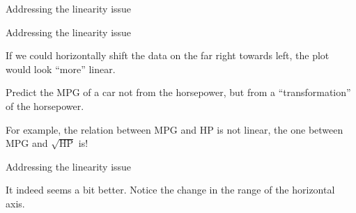 \documentclass{beamer}\usepackage[]{graphicx}\usepackage[]{color}
\makeatletter
\newcommand{\hlstr}[1]{\textcolor[rgb]{1,0.894,0.71}{#1}}%
\newcommand{\hlopt}[1]{\textcolor[rgb]{1,0.894,0.769}{#1}}%
\newcommand{\hlstd}[1]{\textcolor[rgb]{1,0.894,0.769}{#1}}%
\newcommand{\hlkwb}[1]{\textcolor[rgb]{0.804,0.776,0.451}{#1}}%
\newcommand{\hlkwc}[1]{\textcolor[rgb]{0.78,0.941,0.545}{#1}}%
\newcommand{\hlkwd}[1]{\textcolor[rgb]{1,0.78,0.769}{#1}}%
\newenvironment{kframe}{%
 \def\at@end@of@kframe{}%
 \ifinner\ifhmode%
  \def\at@end@of@kframe{\end{minipage}}%
  \begin{minipage}{\columnwidth}%
 \fi\fi%
 \def\FrameCommand##1{\hskip\@totalleftmargin \hskip-\fboxsep
 \colorbox{shadecolor}{##1}\hskip-\fboxsep
     \hskip-\linewidth \hskip-\@totalleftmargin \hskip\columnwidth}%
 \MakeFramed {\advance\hsize-\width
   \@totalleftmargin\z@ \linewidth\hsize
   \@setminipage}}%
 {\par\unskip\endMakeFramed%
 \at@end@of@kframe}
\newenvironment{knitrout}{}{} %
\makeatother
\begin{document}
\begin{darkframes}
\begin{frame}[fragile]{Addressing the linearity issue}
\begin{knitrout}
\end{knitrout}
    \end{frame}
    
    
    
    \begin{frame}[fragile]{Addressing the linearity issue}
      \begin{center}
        If we could horizontally shift the data on the far right towards left, the plot would look ``more'' linear.
        \bigskip \pause
        
        Predict the MPG of a car not from the horsepower, but from a ``transformation'' of the horsepower. \pause
        \bigskip
        
        For example, the relation between MPG and HP is not linear, the one between MPG and $\sqrt{\text{HP}}$ is!
      \end{center}
    
    \end{frame}
    
    
    
    
    
    
      
    
    
    
    \begin{frame}[fragile]{Addressing the linearity issue}
      \fontsize{9}{9}\selectfont
      
        It indeed seems a bit better. Notice the change in the range of the horizontal axis. \pause
      

\end{frame}
\end{darkframes}
\end{document}
